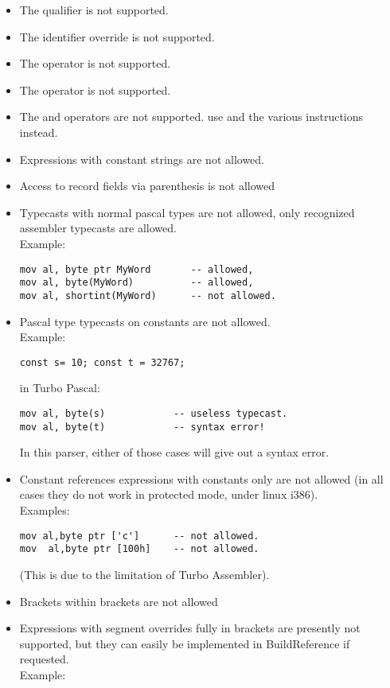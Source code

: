 \documentclass{report}
\begin{document}
\begin{itemize}
\item  The  qualifier is not supported.
\item  The \var{\&} identifier override is not supported.
\item  The  operator is not supported.
\item  The  operator is not supported.
\item  The  and  operators are not supported.
     use  and the various  instructions instead.
\item  Expressions with constant strings are not allowed.
\item  Access to record fields via parenthesis is not allowed
\item  Typecasts with normal pascal types are not allowed, only
    recognized assembler typecasts are allowed.\\ Example:
\begin{verbatim}
mov al, byte ptr MyWord       -- allowed,
mov al, byte(MyWord)          -- allowed,
mov al, shortint(MyWord)      -- not allowed.
\end{verbatim}
\item  Pascal type typecasts on constants are not allowed. \\
Example: 
\begin{verbatim}
const s= 10; const t = 32767;
\end{verbatim}
in Turbo Pascal:
\begin{verbatim}
mov al, byte(s)            -- useless typecast.
mov al, byte(t)            -- syntax error!
\end{verbatim}
In this parser, either of those  cases will give out a syntax error.
\item  Constant references expressions with constants only are not
   allowed (in all cases they do not work in protected mode,
    under linux i386). \\ Examples:
\begin{verbatim}
mov al,byte ptr ['c']      -- not allowed.
mov  al,byte ptr [100h]    -- not allowed.
\end{verbatim}
 (This is due to the limitation of Turbo Assembler).
\item  Brackets within brackets are not allowed
\item  Expressions with segment overrides fully in brackets are
presently not supported, but they can easily be implemented
in BuildReference if requested. \\ Example:

\end{itemize}
\end{document}
